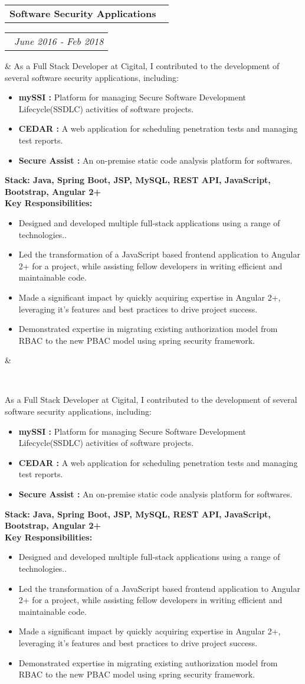 \documentclass[14pt,a4paper,sans]{moderncv}
\makeatletter
\newcommand*{\customcventry}[7][.13em]{
    \begin{tabular}{@{}l}
    {\bfseries #4} \
        {\itshape #3}
    \end{tabular}
    \hfill
    \begin{tabular}{l@{}}
    {\bfseries #5} \
        {\itshape #2}
    \end{tabular}
    \ifx
        &#7&%
    \else
            {\
        \begin{minipage}{\maincolumnwidth}%
        \small#7%
        \end{minipage}}
    \fi%
    \par\addvspace{#1}}
\makeatother
\begin{document}
    \customcventry{June 2016 ‐ Feb 2018}{{\color{blue}{(Cigital, Synopsys)}}}{Software Security Applications}{}{}
    {
        \vspace{0.5em}
        {As a Full Stack Developer at Cigital, I contributed to the development of several software security applications, including:}
        {\begin{itemize}[leftmargin=0.6cm, label={\textbullet}]
             \item \textbf{mySSI :} Platform for managing Secure Software Development Lifecycle(SSDLC) activities of software projects.
             \item \textbf{CEDAR :} A web application for scheduling penetration tests and managing test reports.
             \item \textbf{Secure Assist :} An on-premise static code analysis platform for softwares.
        \end{itemize}}
        {\textbf{Stack: Java, Spring Boot, JSP, MySQL, REST API, JavaScript, Bootstrap, Angular 2+ }}
        \\
        {\hspace{1em}\textbf{Key Responsibilities:}}
        {\begin{itemize}[leftmargin=0.6cm, label={\textbullet}]
             \item Designed and developed multiple full-stack applications using a range of technologies..
             \item Led the transformation of a JavaScript based frontend application to Angular 2+ for a project, while assisting fellow developers in writing efficient and maintainable code.
             \item Made a significant impact by quickly acquiring expertise in Angular 2+, leveraging it's features and best practices to drive project success.
             \item Demonstrated expertise in migrating existing authorization model from RBAC to the new PBAC model using spring security framework.
        \end{itemize}}
    }
\end{document}
